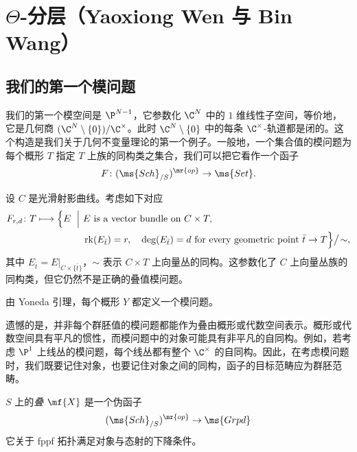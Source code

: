 \section{\(\Theta\)-分层（Yaoxiong Wen 与 Bin Wang）}%
\label{sec:Theta-stratifications}

\subsection{我们的第一个模问题}%
\label{sub:Our first moduli problem}

我们的第一个模空间是 \(\P^{N-1}\)，它参数化 \(\C^N\) 中的 \(1\) 维线性子空间，等价地，它是几何商 \((\C^N \setminus \{0\}) / \C^{\times}\)。此时 \(\C^N\setminus\{0\}\) 中的每条 \(\C^{\times}\)-轨道都是闭的。这个构造是我们关于几何不变量理论的第一个例子。一般地，一个集合值的模问题为每个概形 \(T\) 指定 \(T\) 上族的同构类之集合，我们可以把它看作一个函子
\[ F \colon (\ms{Sch}_{/S})^{\mr{op}} \to \ms{Set}. \]

\begin{exm}
    设 \(C\) 是光滑射影曲线。考虑如下对应
    \[
    \begin{aligned}
        F_{r,d}\colon T \longmapsto
        \Bigl\{
        E \ \Bigm|\ &
        E \text{ is a vector bundle on } C\times T,\\
        &\operatorname{rk}(E_{\bar t})=r,\quad \deg(E_{\bar t})=d
        \text{ for every geometric point } \bar t\to T
        \Bigr\}\big/\!\sim,
    \end{aligned}
    \]
    其中 \(E_{\bar t}=E|_{C\times\{\bar t\}}\)，\(\sim\) 表示 \(C\times T\) 上向量丛的同构。这参数化了 \(C\) 上向量丛族的同构类，但它仍然不是正确的叠值模问题。
\end{exm}

\begin{exm}
    由 Yoneda 引理，每个概形 \(Y\) 都定义一个模问题。
\end{exm}

遗憾的是，并非每个群胚值的模问题都能作为叠由概形或代数空间表示。概形或代数空间具有平凡的惯性，而模问题中的对象可能具有非平凡的自同构。例如，若考虑 \(\P^1\) 上线丛的模问题，每个线丛都有整个 \(\C^{\times}\) 的自同构。因此，在考虑模问题时，我们既要记住对象，也要记住对象之间的同构，函子的目标范畴应为群胚范畴。

\begin{defn}[informal]
    \(S\) 上的\textit{叠} \(\mf{X}\) 是一个伪函子
    \[ (\ms{Sch}_{/S})^{\mr{op}} \to \ms{Grpd} \]
    它关于 fppf 拓扑满足对象与态射的下降条件。
\end{defn}

